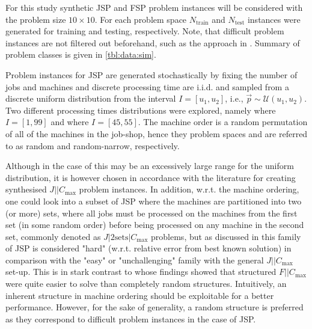 \documentclass[smallextended]{svjour3}
\begin{document}
For this study synthetic JSP and FSP problem instances will be considered with 
the problem size $10\times10$. 
For each problem space $N_{\text{train}}$  and $N_{\text{test}}$ instances were 
generated for training and testing, respectively. 
Note, that difficult problem instances are not filtered out beforehand, such as 
the approach in \citet{Whitley}. 
Summary of problem classes is given in \cref{tbl:data:sim}.  

Problem instances for JSP are generated stochastically by fixing the number of 
jobs and machines and discrete processing time are i.i.d. and sampled from a 
discrete uniform distribution from the interval $I=[u_1,u_2]$, i.e., 
$\vec{p}\sim \mathcal{U}(u_1,u_2)$. 
Two different processing times distributions were explored, namely   
where $I=[1,99]$ and   where $I=[45,55]$.
The machine order is a random permutation of all of the machines in the 
job-shop, hence they problem spaces    and   are 
referred to as random and random-narrow, respectively. 

Although in the case of   this may be an excessively large range for 
the uniform distribution, it is however chosen in accordance with the 
literature \citep{Demirkol98} for creating synthesised $J||C_{\max}$ problem 
instances. In addition, w.r.t. the machine ordering, one could look into a 
subset of JSP where the machines are partitioned into two (or more) sets, where 
all jobs must be processed on the machines from the first set (in some random 
order) before being processed on any machine in the second set, commonly 
denoted as $J|2\textrm{sets}|C_{\max}$ problems, but as discussed in 
\cite{orlib_swv} this family of JSP is considered "hard" (w.r.t. relative error 
from best known solution) in comparison with the "easy" or "unchallenging" 
family with the general $J||C_{\max}$ set-up. %
This is in stark contrast to \citet{Whitley} whose findings showed that 
structured $F||C_{\max}$ were quite easier to solve than completely random 
structures. 
Intuitively, an inherent structure in machine ordering should be exploitable 
for a better performance.  However, for the sake of generality, a random 
structure is preferred as they correspond to difficult problem instances in the 
case of JSP. 
\end{document}
